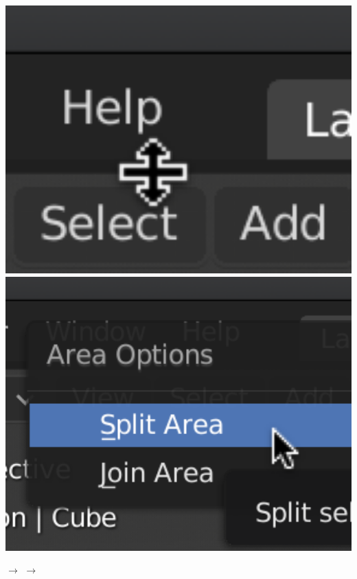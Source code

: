 \documentclass[11pt]{article}
\begin{document}
{
\centering
\begin{minipage}{0.15\textwidth}
    \includegraphics[width=1.0\textwidth]{split-1}\\
    \includegraphics[width=1.0\textwidth]{split-2}
\end{minipage} $\rightarrow$
 $\rightarrow$
\vspace{0.7em}
}
\end{document}
